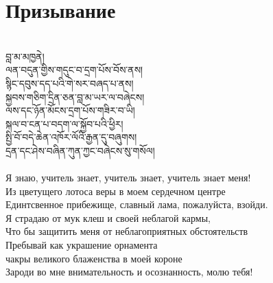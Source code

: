 \section{Призывание}
\\
\ti
བླ་མ་མཁྱནེ།\\
ལན་བདུན་གྱིས་གདུང་བ་དྲག་པོས་བོས་ནས།\\
སྙིང་དབུས་དད་པའི་གེ་སར་བཞད་པ་ནས།\\
སྐྱབས་གཅིག་དྲིན་ཅན་བླ་མ་ཡར་ལ་བཞེངས།\\
ལས་དང་ཉོན་མོངས་དྲག་པོས་གཟིར་བ་ཡི།\\
སྐལ་བ་ངན་པ་བདག་ལ་སྐྱོབ་པའི་ཕྱིར།\\
སྤྱི་བོ་བདེ་ཆེན་འཁོར་ལོའི་རྒྱན་དུ་བཞུགས།\\
དྲན་དང་ཤེས་བཞིན་ཀུན་ཀྱང་བཞེངས་སུ་གསོལ།\\
\\
\ru
Я знаю, учитель знает, учитель знает, учитель знает меня!\\
Из цветущего лотоса веры в моем сердечном центре \\
Единтсвенное прибежище, славный лама, пожалуйста, взойди.\\
Я страдаю от мук клеш и своей неблагой кармы,\\
Что бы защитить меня от неблагоприятных обстоятельств\\
Пребывай как украшение орнамента \\
чакры великого блаженства в моей короне \\
Зароди во мне внимательность и осознанность, молю тебя!\\

